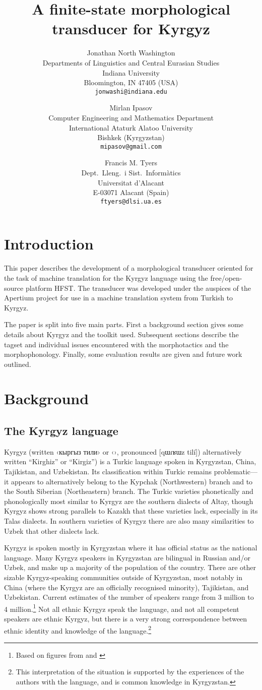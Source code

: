 \documentclass[10pt,a4paper,twocolumn]{article}
\title{A finite-state morphological transducer for Kyrgyz}
\author{Jonathan North Washington\\
Departments of Linguistics and Central Eurasian Studies\\
Indiana University\\
Bloomington, IN 47405 (USA)\\
\texttt{jonwashi@indiana.edu} \and
Mirlan Ipasov\\
Computer Engineering and Mathematics Department\\
International Ataturk Alatoo University\\
Bishkek (Kyrgyzstan)\\
\texttt{mipasov@gmail.com} \and
Francis M. Tyers\\
Dept.\ Lleng.\ i Sist.\ Informàtics \\  
Universitat d'Alacant\\
E-03071 Alacant (Spain)\\
\texttt{ftyers@dlsi.ua.es} 
 }
\date{}
\begin{document}
\maketitleabstract{}
\pagestyle{empty}


\section{Introduction}
This paper describes the development of a morphological transducer oriented for the task of machine translation for the Kyrgyz language using the free/open-source platform HFST. The transducer was developed under the auspices of the Apertium \citep{forcada2011} project for use in a machine translation system from Turkish to Kyrgyz.

The paper is split into five main parts. First a background section gives some details about Kyrgyz and the toolkit used. Subsequent sections describe the tagset and individual issues encountered with the morphotactics and the morphophonology. Finally, some evaluation results are given and future work outlined.

\section{Background}
\subsection{The Kyrgyz language}
Kyrgyz (written ‹кыргыз тили› or ‹›, pronounced [qɯɾʁɯz tilí]) alternatively written ``Kirghiz'' or ``Kirgiz'') is a Turkic language spoken in Kyrgyzstan, China, Tajikistan, and Uzbekistan.  Its classification within Turkic remains problematic—it appears to alternatively belong to the Kypchak (Northwestern) branch and to the South Siberian (Northeastern) branch.  The Turkic varieties phonetically and phonologically most similar to Kyrgyz are the southern dialects of Altay, though Kyrgyz shows strong parallels to Kazakh that these varieties lack, especially in its Talas dialects.  In southern varieties of Kyrgyz there are also many similarities to Uzbek that other dialects lack.

Kyrgyz is spoken mostly in Kyrgyzstan where it has official status as the national language.  Many Kyrgyz speakers in Kyrgyzstan are bilingual in Russian and/or Uzbek, and make up a majority of the population of the country.  There are other sizable Kyrgyz-speaking communities outside of Kyrgyzstan, most notably in China (where the Kyrgyz are an officially recognised minority), Tajikistan, and Uzbekistan.  Current estimates of the number of speakers range from 3 million to 4 million.\footnote{Based on figures from \cite{lewis2009} and \cite{factbook2009}}  Not all ethnic Kyrgyz speak the language, and not all competent speakers are ethnic Kyrgyz, but there is a very strong correspondence between ethnic identity and knowledge of the language.\footnote{This interpretation of the situation is supported by the experiences of the authors with the language, and is common knowledge in Kyrgyzstan.}
\end{document}

